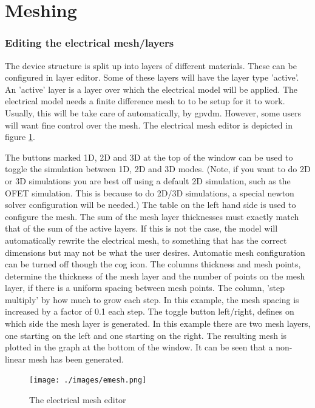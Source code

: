 
\section{Meshing}
\label{ref:mesh}
\subsubsection{Editing the electrical mesh/layers}
The device structure is split up into layers of different materials.  These can be configured in layer editor.  Some of these layers will have the layer type 'active'.  An 'active' layer is a layer over which the electrical model will be applied.  The electrical model needs a finite difference mesh to to be setup for it to work.  Usually, this will be take care of automatically, by gpvdm.  However, some users will want fine control over the mesh.  The electrical mesh editor is depicted in figure \ref{fig:emesh}.


The buttons marked 1D, 2D and 3D at the top of the window can be used to toggle the simulation between 1D, 2D and 3D modes.  (Note, if you want to do 2D or 3D simulations you are best off using a default 2D simulation, such as the OFET simulation.  This is because to do 2D/3D simulations, a special newton solver configuration will be needed.) The table on the left hand side is used to configure the mesh.  The sum of the mesh layer thicknesses must exactly match that of the sum of the active layers.  If this is not the case, the model will automatically rewrite the electrical mesh, to something that has the correct dimensions but may not be what the user desires.  Automatic mesh configuration can be turned off though the cog icon.  The columns thickness and mesh points, determine the thickness of the mesh layer and the number of points on the mesh layer, if there is a uniform spacing between mesh points.  The column, 'step multiply' by how much to grow each step.  In this example, the mesh spacing is increased by a factor of 0.1 each step.  The toggle button left/right, defines on which side the mesh layer is generated.  In this example there are two mesh layers, one starting on the left and one starting on the right.  The resulting mesh is plotted in the graph at the bottom of the window.  It can be seen that a non-linear mesh has been generated.

\begin{figure}[ht!]
\centering
\texttt{[image: ./images/emesh.png]}
\caption{The electrical mesh editor}
\label{fig:emesh}
\end{figure}

